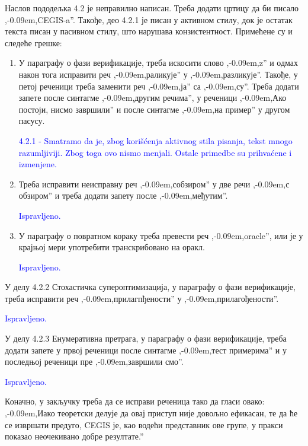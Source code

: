 \documentclass[a4paper]{report}
\newcommand{\odgovor}[1]{\textcolor{blue}{#1}}
\def\zn{,\kern-0.09em,}
\begin{document}
\par Наслов пододељка 4.2 је неправилно написан. Треба додати цртицу да би писало \zn CEGIS-a''. Такође, део 4.2.1 је писан у активном стилу, док је остатак текста писан у пасивном стилу, што нарушава конзистентност. Примећене су и следеће грешке:
\begin{enumerate}
\item У параграфу о фази верификације, треба искосити слово \zn z'' и одмах након тога исправити реч \zn раликује'' у \zn разликује''. Такође, у петој реченици треба заменити реч \zn ја'' са \zn су''. Треба додати запете после синтагме \zn другим речима'', у реченици \zn Ако постоји, нисмо завршили'' и после синтагме \zn на пример'' у другом пасусу.

\odgovor{4.2.1 - Smatramo da je, zbog korišćenja aktivnog stila pisanja, tekst mnogo razumljiviji. Zbog toga ovo nismo menjali.
Ostale primedbe su prihvaćene i izmenjene.}

\item Треба исправити неисправну реч \zn собзиром'' у две речи \zn с обзиром'' и треба додати запету после \zn међутим''.

\odgovor{Ispravljeno.}

\item У параграфу о повратном кораку треба превести реч \zn oracle'', или је у крајњој мери употребити транскрибовано на оракл.

\odgovor{Ispravljeno.}

\end{enumerate}

\par У делу 4.2.2 Стохастичка супероптимизација, у параграфу о фази верификације, треба исправити реч \zn прилагпђености'' у \zn прилагођености''.

\odgovor{Ispravljeno.}

\par У делу 4.2.3 Енумеративна претрага, у параграфу о фази верификације, треба додати запете у првој реченици после синтагме \zn тест примерима'' и у последњој реченици пре \zn завршили смо''.

\odgovor{Ispravljeno.}

\par Коначно, у закључку треба да се исправи реченица тако да гласи овако: \zn Иако теоретски делује да овај приступ није довољно ефикасан, те да ће се извршати предуго, CEGIS је, као водећи представник ове групе, у пракси показао неочекивано добре резултате.''
\end{document}
